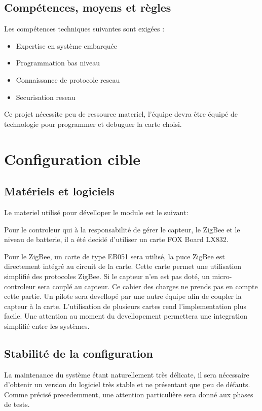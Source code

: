 \subsection{Compétences, moyens et règles}
Les compétences techniques suivantes sont exigées :
\begin{itemize}
\item Expertise en système embarquée
\item Programmation bas niveau
\item Connaissance de protocole reseau
\item Securisation reseau
\end{itemize}
Ce projet nécessite peu de ressource materiel, l'équipe devra être équipé de technologie pour programmer et debuguer la carte choisi. 

\section{Configuration cible}

\subsection{Matériels et logiciels}
Le materiel utilisé pour dévelloper le module est le suivant:

Pour le controleur qui à la responsabilité de gérer le capteur, le ZigBee et le niveau de batterie, il a été decidé d'utiliser un carte FOX Board LX832.

Pour le ZigBee, un carte de type EB051 sera utilisé, la puce ZigBee est directement intégré au circuit de la carte. Cette carte permet une utilisation simplifié des protocoles ZigBee.
Si le capteur n'en est pas doté, un micro-controleur sera couplé au capteur. Ce cahier des charges ne prends pas en compte cette partie. Un pilote sera devellopé par une autre équipe afin de coupler la capteur à la carte.
L'utilisation de plusieurs cartes rend l'implementation plus facile. Une attention au moment du devellopement permettera une integration simplifié entre les systèmes.

\subsection{Stabilité de la configuration}

La maintenance du système étant naturellement très délicate, il sera nécessaire d'obtenir un version du logiciel très stable et ne présentant que peu de défauts. Comme précisé precedemment, une attention particulière sera donné aux phases de tests.

